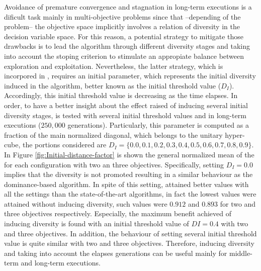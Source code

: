 Avoidance of premature convergence and stagnation in long-term executions is a dificult task mainly in multi-objective problems since that --depending of the problem-- the objective space implicitly involves a relation of diversity in the decision variable space.
%
For this reason, a potential strategy to mitigate those drawbacks is to lead the algorithm through different diversity stages and taking into account the stoping criterion to stimulate an appropiate balance between exploration and exploitation.
%
Nevertheless, the latter strategy, which is incorpored in \VSDMOEA{}, requires an initial parameter, which represents the initial diversity induced in the algorithm, better known as the initial threshold value ($D_I$).
%
Accordingly, this initial threshold value is decreasing as the time elapses.
%
In order, to have a better insight about the effect raised of inducing several initial diversity stages, \VSDMOEA{} is tested with several initial threshold values and in long-term executions ($250,000$ generations).
%
Particularly, this parameter is computed as a fraction of the main normalized diagonal, which belongs to the unitary hyper-cube, the portions considered are $D_I = \{0.0, 0.1, 0.2, 0.3, 0.4, 0.5, 0.6, 0.7, 0.8, 0.9\}$.
%
In Figure \ref{fig:Initial-distance-factor} is shown the general normalized mean of the \HV{} for each configuration with two an three objectives.
%
Specifically, setting $D_I=0.0$ implies that the diversity is not promoted resulting in a similar behaviour as the dominance-based algorithm.
%
In spite of this setting, \VSDMOEA{} attained better \HV{} values with all the settings than the state-of-the-art algorithms, in fact the lowest values were attained without inducing diversity, such values were $0.912$ and $0.893$ for two and three objectives respectively.
%
Especially, the maximum benefit achieved of inducing diversity is found with an initial threshold value of $DI=0.4$ with two and three objectives.
%
In addition, the behaviour of setting several initial threshold value is quite similar with two and three objectives.
%
Therefore, inducing diversity and taking into account the elapses generations can be useful mainly for middle-term and long-term executions.


